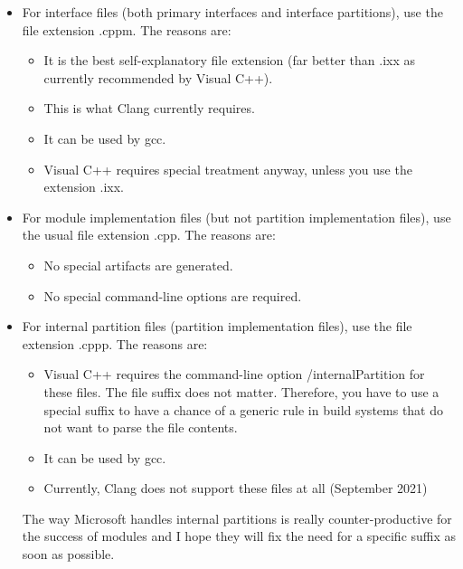 \begin{itemize}
\item 
For interface files (both primary interfaces and interface partitions), use the file extension .cppm. The reasons are:

\begin{itemize}
\item 
It is the best self-explanatory file extension (far better than .ixx as currently recommended by Visual C++).

\item 
This is what Clang currently requires.

\item 
It can be used by gcc.

\item 
Visual C++ requires special treatment anyway, unless you use the extension .ixx.
\end{itemize}


\item 
For module implementation files (but not partition implementation files), use the usual file extension .cpp. The reasons are:

\begin{itemize}
\item 
No special artifacts are generated.

\item 
No special command-line options are required.
\end{itemize}

\item 
For internal partition files (partition implementation files), use the file extension .cppp. The reasons are:

\begin{itemize}
\item 
Visual C++ requires the command-line option /internalPartition for these files. The file suffix does not matter. Therefore, you have to use a special suffix to have a chance of a generic rule in build systems that do not want to parse the file contents.

\item 
It can be used by gcc.

\item 
Currently, Clang does not support these files at all (September 2021)
\end{itemize}

The way Microsoft handles internal partitions is really counter-productive for the success of modules and I hope they will fix the need for a specific suffix as soon as possible.

\end{itemize}

